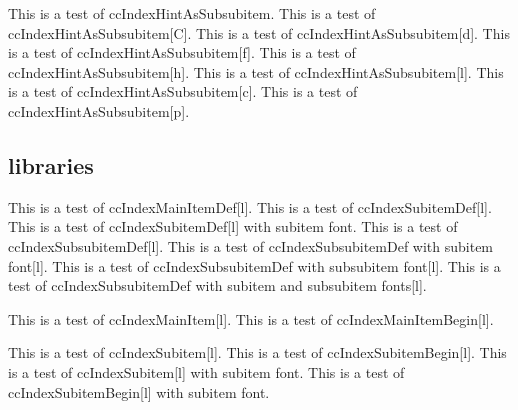 \documentclass{article}
\begin{document}
{{{{This is a test of ccIndexHintAsSubsubitem.
This is a test of ccIndexHintAsSubsubitem[C].
This is a test of ccIndexHintAsSubsubitem[d].
This is a test of ccIndexHintAsSubsubitem[f].
This is a test of ccIndexHintAsSubsubitem[h].
This is a test of ccIndexHintAsSubsubitem[l].
This is a test of ccIndexHintAsSubsubitem[c].
This is a test of ccIndexHintAsSubsubitem[p].

\subsection{libraries}

This is a test of ccIndexMainItemDef[l].
This is a test of ccIndexSubitemDef[l].
This is a test of ccIndexSubitemDef[l] with subitem font.
This is a test of ccIndexSubsubitemDef[l].
This is a test of ccIndexSubsubitemDef with subitem font[l].
This is a test of ccIndexSubsubitemDef with subsubitem font[l].
This is a test of ccIndexSubsubitemDef with subitem and subsubitem fonts[l].

\pagebreak

This is a test of ccIndexMainItem[l].
This is a test of ccIndexMainItemBegin[l].

This is a test of ccIndexSubitem[l].
This is a test of ccIndexSubitemBegin[l].
This is a test of ccIndexSubitem[l] with subitem font.
This is a test of ccIndexSubitemBegin[l] with subitem font.

}}}}
\end{document}
